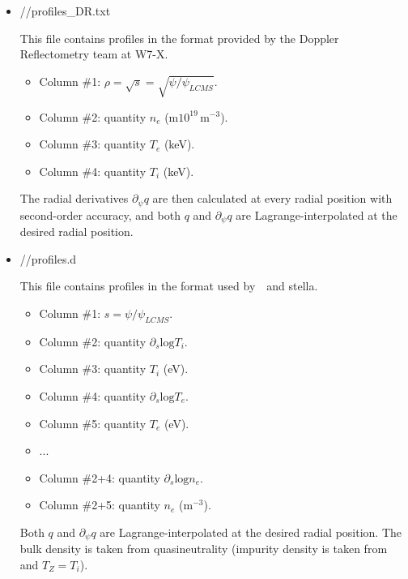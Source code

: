 \begin{itemize}
\item {\ttfamily //profiles\_DR.txt}

This file contains profiles in the format provided by the Doppler Reflectometry team at W7-X.
\begin{itemize}
\item Column \#1: $\rho=\sqrt{s}=\sqrt{\psi/\psi_{LCMS}}$.
\item Column \#2: quantity $n_e$ (m$10^{19}\,$m$^{-3}$).
\item Column \#3: quantity $T_e$ (keV).
\item Column \#4: quantity $T_i$ (keV).
\end{itemize}
The radial derivatives $\partial_\psi q$ are then calculated at every  radial position with second-order accuracy, and both $q$ and $\partial_\psi q$ are Lagrange-interpolated at the desired radial position.


\item {\ttfamily //profiles.d}

This file contains profiles in the format used by~\EUTERPE~and {\ttfamily stella}.
\begin{itemize}
\item Column \#1: $s=\psi/\psi_{LCMS}$.
\item Column \#2: quantity $\partial_s\mathrm{log}T_i$.
\item Column \#3: quantity $T_i$ (eV).
\item Column \#4: quantity $\partial_s\mathrm{log}T_e$.
\item Column \#5: quantity $T_e$ (eV).
\item ...
\item Column \#2+4: quantity $\partial_s\mathrm{log}n_e$.
\item Column \#2+5: quantity $n_e$ (m$^{-3}$).
\end{itemize}
Both $q$ and $\partial_\psi q$ are Lagrange-interpolated at the desired radial position. The bulk density is taken from quasineutrality (impurity density is taken from  and $T_Z=T_i$).



\end{itemize}
